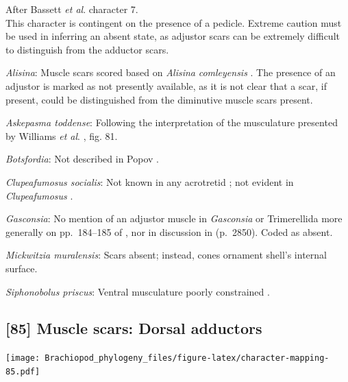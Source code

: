 \documentclass[openany]{book}
\begin{document}
After Bassett \emph{et al}.
\citeyearpar{Bassett2001Functionalmorphology} character 7.\\
This character is contingent on the presence of a pedicle. Extreme
caution must be used in inferring an absent state, as adjustor scars can
be extremely difficult to distinguish from the adductor scars.

\hypertarget{Alisina-coding-84}{}
\emph{Alisina}: Muscle scars scored based on \emph{Alisina}
\emph{comleyensis} \citep{Bassett2001Functionalmorphology}. The presence
of an adjustor is marked as not presently available, as it is not clear
that a scar, if present, could be distinguished from the diminutive
muscle scars present.

\hypertarget{Askepasma_toddense-coding-84}{}
\emph{Askepasma toddense}: Following the interpretation of the
musculature presented by Williams \emph{et al}.
\citeyearpar{Williams2000LinguliformeaCraniiformea}, fig. 81.

\hypertarget{Botsfordia-coding-84}{}
\emph{Botsfordia}: Not described in Popov
\citeyearpar{Popov1992TheCambrian}.

\hypertarget{Clupeafumosus_socialis-coding-84}{}
\emph{Clupeafumosus socialis}: Not known in any acrotretid
\citep{Williams2000LinguliformeaCraniiformea}; not evident in
\emph{Clupeafumosus} \citep{Topper2013Reappraisalof}.

\hypertarget{Gasconsia-coding-84}{}
\emph{Gasconsia}: No mention of an adjustor muscle in \emph{Gasconsia}
or Trimerellida more generally on pp.~184--185 of
\citet{Williams2000LinguliformeaCraniiformea}, nor in discussion in
\citet{Williams2007Supplement} (p.~2850). Coded as absent.

\hypertarget{Mickwitzia_muralensis-coding-84}{}
\emph{Mickwitzia muralensis}: Scars absent; instead, cones ornament
shell's internal surface.

\hypertarget{Siphonobolus_priscus-coding-84}{}
\emph{Siphonobolus priscus}: Ventral musculature poorly constrained
\citep{Williams2000LinguliformeaCraniiformea, Popov2009Earlyontogeny}.

\subsection*{{[}85{]} Muscle scars: Dorsal
adductors}\label{muscle-scars-dorsal-adductors}

\texttt{[image: Brachiopod\_phylogeny\_files/figure-latex/character-mapping-85.pdf]}
\end{document}
